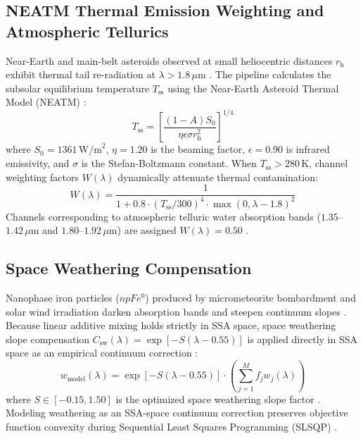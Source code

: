 \documentclass[11pt,a4paper]{article}
\begin{document}
\subsection{NEATM Thermal Emission Weighting and Atmospheric Tellurics}
Near-Earth and main-belt asteroids observed at small heliocentric distances $r_{\text{h}}$ exhibit thermal tail re-radiation at $\lambda > 1.8\,\mu\text{m}$ \cite{Harris1998}. The pipeline calculates the subsolar equilibrium temperature $T_{\text{ss}}$ using the Near-Earth Asteroid Thermal Model (NEATM) \cite{Harris1998}:
\begin{equation}
T_{\text{ss}} = \left[ \frac{(1 - A) S_0}{\eta \epsilon \sigma r_{\text{h}}^2} \right]^{1/4}
\label{eq:neatm_temp}
\end{equation}
where $S_0 = 1361\,\text{W/m}^2$, $\eta = 1.20$ is the beaming factor, $\epsilon = 0.90$ is infrared emissivity, and $\sigma$ is the Stefan-Boltzmann constant. When $T_{\text{ss}} > 280\,\text{K}$, channel weighting factors $W(\lambda)$ dynamically attenuate thermal contamination:
\begin{equation}
W(\lambda) = \frac{1}{1 + 0.8 \cdot (T_{\text{ss}}/300)^4 \cdot \max(0, \lambda - 1.8)^2}
\label{eq:thermal_weights}
\end{equation}
Channels corresponding to atmospheric telluric water absorption bands ($1.35$--$1.42\,\mu\text{m}$ and $1.80$--$1.92\,\mu\text{m}$) are assigned $W(\lambda) = 0.50$ \cite{DeMeo2009}.

\subsection{Space Weathering Compensation}
Nanophase iron particles ($npFe^0$) produced by micrometeorite bombardment and solar wind irradiation darken absorption bands and steepen continuum slopes \cite{Hapke2001, Pieters2000}. Because linear additive mixing holds strictly in SSA space, space weathering slope compensation $C_{\text{sw}}(\lambda) = \exp[-S(\lambda - 0.55)]$ is applied directly in SSA space as an empirical continuum correction \cite{Hapke2001, Bioucas2012}:
\begin{equation}
w_{\text{model}}(\lambda) = \exp\left[-S(\lambda - 0.55)\right] \cdot \left( \sum_{j=1}^{M} f_j w_j(\lambda) \right)
\label{eq:weathering_ssa}
\end{equation}
where $S \in [-0.15, 1.50]$ is the optimized space weathering slope factor \cite{Hapke2001}. Modeling weathering as an SSA-space continuum correction preserves objective function convexity during Sequential Least Squares Programming (SLSQP) \cite{Lawson1995}.
\end{document}
